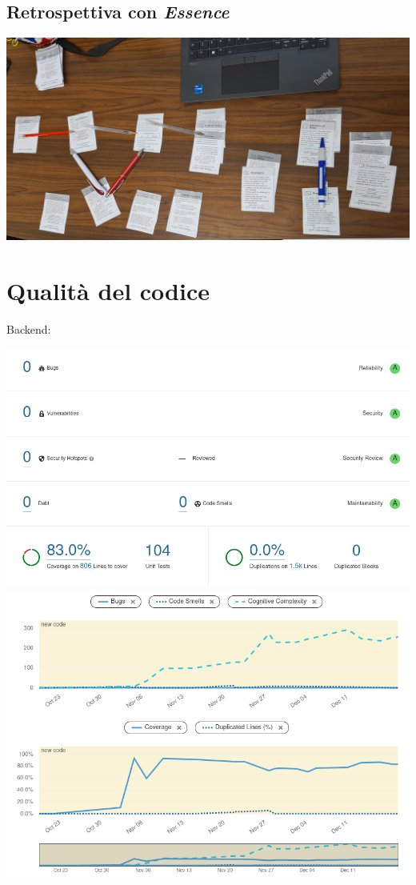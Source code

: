 \documentclass{article}
\begin{document}
\subsection{Retrospettiva con \emph{Essence}}

\includegraphics[width=\textwidth]{essence-4-0.jpg}

\section{Qualità del codice}

Backend:

\includegraphics[width=\textwidth]{quality-backend-overall.png}
\includegraphics[width=\textwidth]{quality-backend-activity.png}
\end{document}
